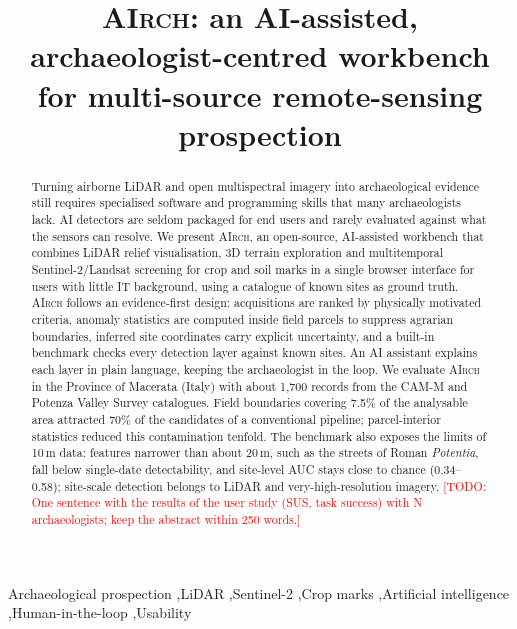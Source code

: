 \documentclass[review,authoryear,12pt]{elsarticle}
\newcommand{\airch}{\textsc{AIrch}}
\newcommand{\todo}[1]{\textcolor{red}{[TODO: #1]}}
\begin{document}
\begin{frontmatter}

\title{\airch: an AI-assisted, archaeologist-centred workbench for multi-source remote-sensing prospection}


\begin{abstract}
Turning airborne LiDAR and open multispectral imagery into archaeological evidence still requires specialised software and programming skills that many archaeologists lack. AI detectors are seldom packaged for end users and rarely evaluated against what the sensors can resolve. We present \airch, an open-source, AI-assisted workbench that combines LiDAR relief visualisation, 3D terrain exploration and multitemporal Sentinel-2/Landsat screening for crop and soil marks in a single browser interface for users with little IT background, using a catalogue of known sites as ground truth. \airch{} follows an evidence-first design: acquisitions are ranked by physically motivated criteria, anomaly statistics are computed inside field parcels to suppress agrarian boundaries, inferred site coordinates carry explicit uncertainty, and a built-in benchmark checks every detection layer against known sites. An AI assistant explains each layer in plain language, keeping the archaeologist in the loop. We evaluate \airch{} in the Province of Macerata (Italy) with about 1,700 records from the CAM-M and Potenza Valley Survey catalogues. Field boundaries covering 7.5\% of the analysable area attracted 70\% of the candidates of a conventional pipeline; parcel-interior statistics reduced this contamination tenfold. The benchmark also exposes the limits of 10\,m data: features narrower than about 20\,m, such as the streets of Roman \textit{Potentia}, fall below single-date detectability, and site-level AUC stays close to chance (0.34--0.58); site-scale detection belongs to LiDAR and very-high-resolution imagery. \todo{One sentence with the results of the user study (SUS, task success) with N archaeologists; keep the abstract within 250 words.}
\end{abstract}

\begin{keyword}
Archaeological prospection \sep LiDAR \sep Sentinel-2 \sep Crop marks \sep Artificial intelligence \sep Human-in-the-loop \sep Usability
\end{keyword}

\end{frontmatter}














\end{document}
